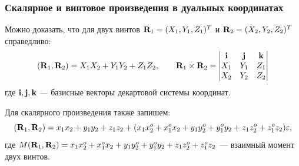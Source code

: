\begin{frame}
  \frametitle{Скалярное и винтовое произведения в дуальных координатах}
  Можно доказать, что для двух винтов $\vb{R}_1 = (X_1, Y_1, Z_1)^T$ и $\vb{R}_2 = (X_2, Y_2, Z_2)^T$ справедливо:
  \begin{equation*}
    (\vb{R}_1, \vb{R}_2) = X_1X_2 + Y_1Y_2 + Z_1Z_2,
    \qquad
    \vb{R}_1 \times \vb{R}_2 = 
    \begin{vmatrix}
      \vb{i} & \vb{j} & \vb{k}\\
      X_1 & Y_1 & Z_1\\
      X_2 & Y_2 & Z_2\\
    \end{vmatrix}
  \end{equation*}
  где $\vb{i}, \vb{j}, \vb{k}$ — базисные векторы декартовой системы координат.

  Для скалярного произведения также запишем:
  \begin{equation*}
    (\vb{R}_1, \vb{R}_2) = x_1x_2 + y_1y_2 + z_1 z_2 + (x_1x^o_2 + x_1^ox_2 + y_1y_2^o + y_1^oy_2 + z_1z^o_2 + z_1^oz_2)\varepsilon,
  \end{equation*}
  где $M(\vb{R}_1, \vb{R}_2) = x_1x^o_2 + x_1^ox_2 + y_1y_2^o + y_1^oy_2 + z_1z^o_2 + z_1^oz_2$ — взаимный момент двух винтов.
\end{frame}

